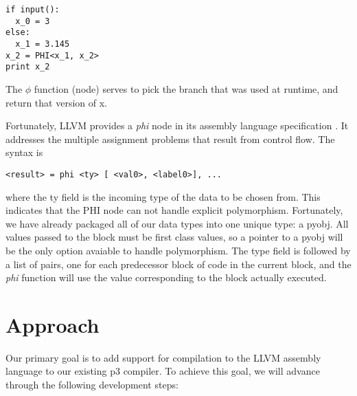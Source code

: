 \documentclass[11pt]{article}
\begin{document}
\begin{verbatim}
if input():
  x_0 = 3
else:
  x_1 = 3.145
x_2 = PHI<x_1, x_2>
print x_2
\end{verbatim}

The $\phi$ function (node) serves to pick the branch that was used at
runtime, and return that version of x.

Fortunately, LLVM provides a \emph{phi} node in its assembly language
specification \cite{llvm.org}. It addresses the multiple assignment
problems that result from control flow. The syntax is

\begin{verbatim}
<result> = phi <ty> [ <val0>, <label0>], ...
\end{verbatim} 

where the ty field is the incoming type of the data to be chosen
from. This indicates that the PHI node can not handle explicit
polymorphism. Fortunately, we have already packaged all of our data
types into one unique type: a pyobj. All values passed to the block
must be first class values, so a pointer to a pyobj will be the only
option avaiable to handle polymorphism. The type field is followed by
a list of pairs, one for each predecessor block of code in the current
block, and the \emph{phi} function will use the value corresponding to
the block actually executed.

\section{Approach}

Our primary goal is to add support for compilation to the LLVM
assembly language to our existing p3 compiler. To achieve this goal,
we will advance through the following development steps:
\end{document}

